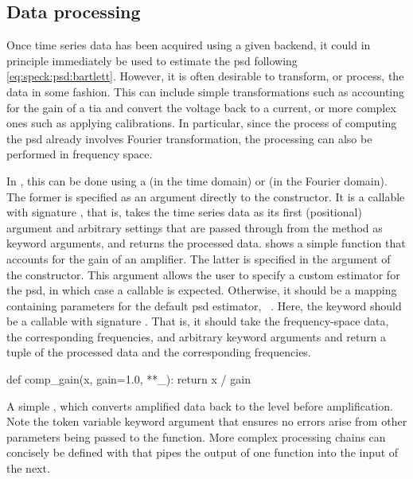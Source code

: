 \subsection{Data processing}\label{subsec:speck:software:design:processing}
Once time series data has been acquired using a given  backend, it could in principle immediately be used to estimate the \gls{psd} following \cref{eq:speck:psd:bartlett}.
However, it is often desirable to transform, or process, the data in some fashion.
This can include simple transformations such as accounting for the gain of a \gls{tia} and convert the voltage back to a current,
or more complex ones such as applying calibrations.
In particular, since the process of computing the \gls{psd} already involves Fourier transformation, the processing can also be performed in frequency space.

In \pyspeck, this can be done using a  (in the time domain) or  (in the Fourier domain).
The former is specified as an argument directly to the  constructor.
It is a callable with signature , that is, takes the time series data as its first (positional) argument and arbitrary settings that are passed through from the  method as keyword arguments, and returns the processed data.
 shows a simple function that accounts for the gain of an amplifier.
The latter is specified in the  argument of the  constructor.
This argument allows the user to specify a custom estimator for the \gls{psd}, in which case a callable is expected.
Otherwise, it should be a mapping containing parameters for the default \gls{psd} estimator, ~.
Here, the keyword  should be a callable with signature .
That is, it should take the frequency-space data, the corresponding frequencies, and arbitrary keyword arguments and return a tuple of the processed data and the corresponding frequencies.

\begin{marginlisting}
    \begin{py}[fontsize=\footnotesize]
        def comp_gain(x, gain=1.0, **_):
            return x / gain
    \end{py}
    \caption[Simple  example]{
        A simple , which converts amplified data back to the level before amplification.
        Note the token \code{**_} variable keyword argument that ensures no errors arise from other parameters being passed to the function.
        More complex processing chains can concisely be defined with  that pipes the output of one function into the input of the next.
    }
    \label{lst:speck:procfn}
\end{marginlisting}

